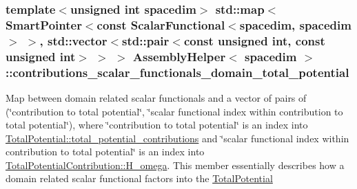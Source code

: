 \subsubsection[{\texorpdfstring{contributions\+\_\+scalar\+\_\+functionals\+\_\+domain\+\_\+total\+\_\+potential}{contributions_scalar_functionals_domain_total_potential}}]{\setlength{\rightskip}{0pt plus 5cm}template$<$unsigned int spacedim$>$ std\+::map$<${\bf Smart\+Pointer}$<$const {\bf Scalar\+Functional}$<$spacedim, spacedim$>$ $>$, std\+::vector$<$std\+::pair$<$const unsigned int, const unsigned int$>$ $>$ $>$ {\bf Assembly\+Helper}$<$ spacedim $>$\+::contributions\+\_\+scalar\+\_\+functionals\+\_\+domain\+\_\+total\+\_\+potential\hspace{0.3cm}{\ttfamily [private]}}\hypertarget{class_assembly_helper_aceaf7ba62dfe0fa06ecb15ee8c14da34}{}\label{class_assembly_helper_aceaf7ba62dfe0fa06ecb15ee8c14da34}
Map between domain related scalar functionals and a vector of pairs of (\char`\"{}contribution to total potential\char`\"{}, \char`\"{}scalar functional index within contribution to total potential\char`\"{}), where \char`\"{}contribution to total potential\char`\"{} is an index into \hyperlink{class_total_potential_a5a14ce0e2fabf8116566aa67fb11db35}{Total\+Potential\+::total\+\_\+potential\+\_\+contributions} and \char`\"{}scalar functional index within contribution to total potential\char`\"{} is an index into \hyperlink{class_total_potential_contribution_a15191539345978a3d0c7293bd7ecaa91}{Total\+Potential\+Contribution\+::\+H\+\_\+omega}. This member essentially describes how a domain related scalar functional factors into the \hyperlink{class_total_potential}{Total\+Potential} 
